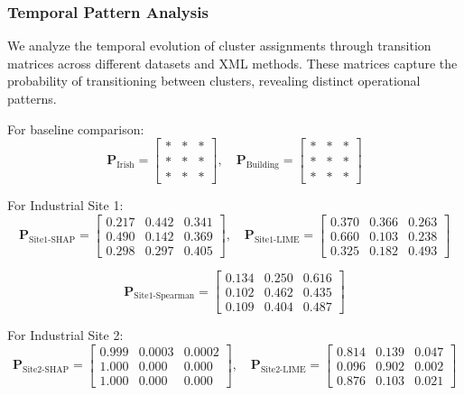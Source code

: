 \documentclass[final,5p,times,twocolumn,numbers]{elsarticle}
\begin{document}
\subsubsection{Temporal Pattern Analysis}
We analyze the temporal evolution of cluster assignments through transition matrices across different datasets and XML methods. These matrices capture the probability of transitioning between clusters, revealing distinct operational patterns.

For baseline comparison:
\begin{equation*}
\mathbf{P}_{\text{Irish}} = \begin{bmatrix}
* & * & * \\
* & * & * \\
* & * & *
\end{bmatrix}, \quad
\mathbf{P}_{\text{Building}} = \begin{bmatrix}
* & * & * \\
* & * & * \\
* & * & *
\end{bmatrix}
\end{equation*}

For Industrial Site 1:
\begin{equation*}
\mathbf{P}_{\text{Site1-SHAP}} = \begin{bmatrix}
0.217 & 0.442 & 0.341 \\
0.490 & 0.142 & 0.369 \\
0.298 & 0.297 & 0.405
\end{bmatrix}, \quad
\mathbf{P}_{\text{Site1-LIME}} = \begin{bmatrix}
0.370 & 0.366 & 0.263 \\
0.660 & 0.103 & 0.238 \\
0.325 & 0.182 & 0.493
\end{bmatrix}
\end{equation*}

\begin{equation}
\mathbf{P}_{\text{Site1-Spearman}} = \begin{bmatrix}
0.134 & 0.250 & 0.616 \\
0.102 & 0.462 & 0.435 \\
0.109 & 0.404 & 0.487
\end{bmatrix}
\end{equation}

For Industrial Site 2:
\begin{equation*}
\mathbf{P}_{\text{Site2-SHAP}} = \begin{bmatrix}
0.999 & 0.0003 & 0.0002 \\
1.000 & 0.000 & 0.000 \\
1.000 & 0.000 & 0.000
\end{bmatrix}, \quad
\mathbf{P}_{\text{Site2-LIME}} = \begin{bmatrix}
0.814 & 0.139 & 0.047 \\
0.096 & 0.902 & 0.002 \\
0.876 & 0.103 & 0.021
\end{bmatrix}
\end{equation*}
\end{document}

